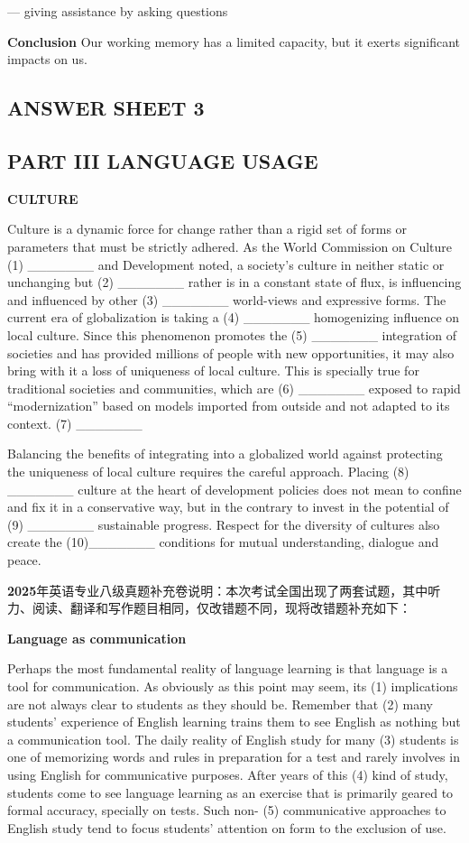 \documentclass[UTF8,11pt]{ctexart}
\begin{document}
— giving assistance by asking questions


\textbf{Conclusion} Our working memory has a limited capacity, but it exerts significant impacts on us.


\subsection*{\textbf{ANSWER SHEET 3}}


\subsection*{\textbf{PART III LANGUAGE USAGE}}


\textbf{CULTURE}


Culture is a dynamic force for change rather than a rigid set of forms or parameters that must be strictly adhered. As the World Commission on Culture (1) \_\_\_\_\_\_\_ and Development noted, a society’s culture in neither static or unchanging but (2) \_\_\_\_\_\_\_ rather is in a constant state of flux, is influencing and influenced by other (3) \_\_\_\_\_\_\_ world-views and expressive forms. The current era of globalization is taking a (4) \_\_\_\_\_\_\_ homogenizing influence on local culture. Since this phenomenon promotes the (5) \_\_\_\_\_\_\_ integration of societies and has provided millions of people with new opportunities, it may also bring with it a loss of uniqueness of local culture. This is specially true for traditional societies and communities, which are (6) \_\_\_\_\_\_\_ exposed to rapid “modernization” based on models imported from outside and not adapted to its context. (7) \_\_\_\_\_\_\_


Balancing the benefits of integrating into a globalized world against protecting the uniqueness of local culture requires the careful approach. Placing (8) \_\_\_\_\_\_\_ culture at the heart of development policies does not mean to confine and fix it in a conservative way, but in the contrary to invest in the potential of (9) \_\_\_\_\_\_\_ sustainable progress. Respect for the diversity of cultures also create the (10)\_\_\_\_\_\_\_ conditions for mutual understanding, dialogue and peace.


\textbf{2025}年英语专业八级真题补充卷说明：本次考试全国出现了两套试题，其中听力、阅读、翻译和写作题目相同，仅改错题不同，现将改错题补充如下：


\textbf{Language as communication}


Perhaps the most fundamental reality of language learning is that language is a tool for communication. As obviously as this point may seem, its (1) implications are not always clear to students as they should be. Remember that (2) many students’ experience of English learning trains them to see English as nothing but a communication tool. The daily reality of English study for many (3) students is one of memorizing words and rules in preparation for a test and rarely involves in using English for communicative purposes. After years of this (4) kind of study, students come to see language learning as an exercise that is primarily geared to formal accuracy, specially on tests. Such non- (5) communicative approaches to English study tend to focus students’ attention on form to the exclusion of use.
\end{document}
